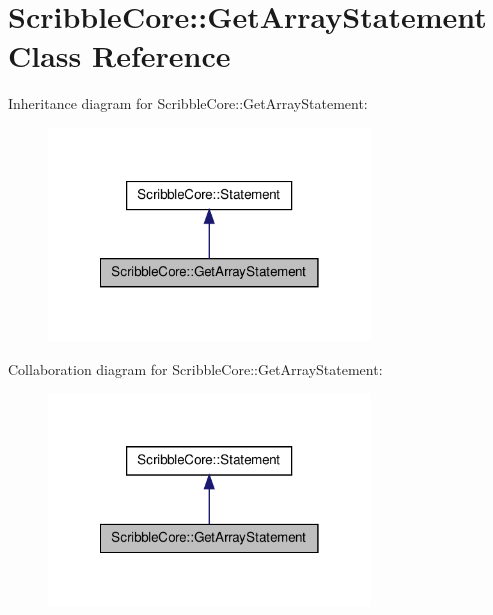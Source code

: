\hypertarget{class_scribble_core_1_1_get_array_statement}{\section{Scribble\-Core\-:\-:Get\-Array\-Statement Class Reference}
\label{class_scribble_core_1_1_get_array_statement}
}


Inheritance diagram for Scribble\-Core\-:\-:Get\-Array\-Statement\-:\nopagebreak
\begin{figure}[H]
\begin{center}
\leavevmode
\includegraphics[width=242pt]{class_scribble_core_1_1_get_array_statement__inherit__graph}
\end{center}
\end{figure}


Collaboration diagram for Scribble\-Core\-:\-:Get\-Array\-Statement\-:\nopagebreak
\begin{figure}[H]
\begin{center}
\leavevmode
\includegraphics[width=242pt]{class_scribble_core_1_1_get_array_statement__coll__graph}
\end{center}
\end{figure}
